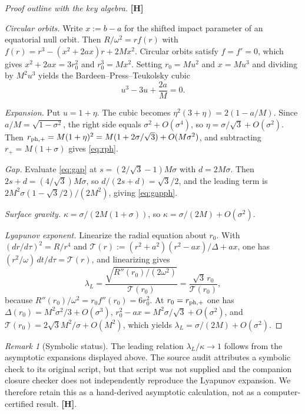 \documentclass[11pt,a4paper]{article}
\newcommand{\VH}{\textcolor{vh}{\textbf{[H]}}}
\theoremstyle{remark}
\newtheorem{remark}[theorem]{Remark}
\theoremstyle{definition}
\begin{document}
\begin{proof}[Proof outline with the key algebra]
\VH

\emph{Circular orbits.} Write $x := b - a$ for the shifted impact parameter of an equatorial null orbit. Then $R/\omega^2 = r f(r)$ with $f(r) = r^3 - (x^2+2ax)r + 2Mx^2$. Circular orbits satisfy $f = f' = 0$, which gives $x^2 + 2ax = 3r_0^2$ and $r_0^3 = Mx^2$. Setting $r_0 = Mu^2$ and $x = Mu^3$ and dividing by $M^2u^3$ yields the Bardeen--Press--Teukolsky cubic
\[
u^3 - 3u + \frac{2a}{M} = 0.
\]

\emph{Expansion.} Put $u = 1+\eta$. The cubic becomes $\eta^2(3+\eta) = 2(1 - a/M)$. Since $a/M = \sqrt{1-\sigma^2}$, the right side equals $\sigma^2 + O(\sigma^4)$, so $\eta = \sigma/\sqrt3 + O(\sigma^2)$. Then $r_{{\rm ph},+} = M(1+\eta)^2 = M(1 + 2\sigma/\sqrt3) + O(M\sigma^2)$, and subtracting $r_+ = M(1+\sigma)$ gives \eqref{eq:rph}.

\emph{Gap.} Evaluate \eqref{eq:gap} at $s = (2/\sqrt3-1)M\sigma$ with $d = 2M\sigma$. Then $2s+d = (4/\sqrt3)M\sigma$, so $d/(2s+d) = \sqrt3/2$, and the leading term is $2M^2\sigma(1-\sqrt3/2)/(2M^2)$, giving \eqref{eq:gapph}.

\emph{Surface gravity.} $\kappa = \sigma/(2M(1+\sigma))$, so $\kappa = \sigma/(2M) + O(\sigma^2)$.

\emph{Lyapunov exponent.} Linearize the radial equation about $r_0$. With $(dr/d\tau)^2 = R/r^4$ and $\mathcal{T}(r) := (r^2+a^2)(r^2-ax)/\Delta + ax$, one has $(r^2/\omega)\,dt/d\tau = \mathcal{T}(r)$, and linearizing gives
\begin{equation}
\lambda_L = \frac{\sqrt{R''(r_0)/(2\omega^2)}}{\mathcal{T}(r_0)} = \frac{\sqrt3\, r_0}{\mathcal{T}(r_0)}, \label{eq:lamdef}
\end{equation}
because $R''(r_0)/\omega^2 = r_0 f''(r_0) = 6r_0^2$. At $r_0 = r_{{\rm ph},+}$ one has $\Delta(r_0) = M^2\sigma^2/3 + O(\sigma^3)$, $r_0^2 - ax = M^2\sigma/\sqrt3 + O(\sigma^2)$, and $\mathcal{T}(r_0) = 2\sqrt3 M^2/\sigma + O(M^2)$, which yields $\lambda_L = \sigma/(2M) + O(\sigma^2)$. \qedhere
\end{proof}

\begin{remark}[Symbolic status]
The leading relation $\lambda_L/\kappa \to 1$ follows from the asymptotic expansions displayed above. The source audit attributes a symbolic check to its original script, but that script was not supplied and the companion closure checker does not independently reproduce the Lyapunov expansion. We therefore retain this as a hand-derived asymptotic calculation, not as a computer-certified result. \VH.
\end{remark}
\end{document}

